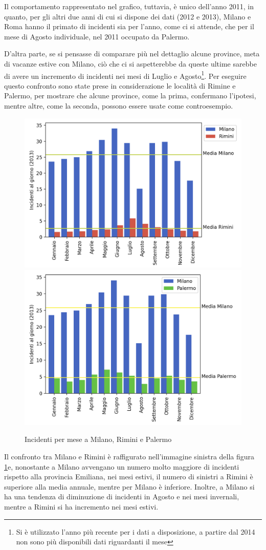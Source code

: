 \documentclass[a4paper,12pt]{report}
\begin{document}
Il comportamento rappresentato nel grafico, tuttavia, è unico dell'anno 2011, in quanto, 
per gli altri due anni di cui si dispone dei dati (2012 e 2013), 
Milano e Roma hanno il primato di incidenti sia per l'anno, come ci si attende, che per il 
mese di Agosto individuale, nel 2011 occupato da Palermo.

D'altra parte, se si pensasse di comparare più nel dettaglio alcune province, 
meta di vacanze estive con Milano, ciò che ci si aspetterebbe da queste ultime sarebbe 
di avere un incremento di incidenti nei mesi di Luglio e 
Agosto\footnote{Si è utilizzato l'anno più recente per i dati a disposizione, 
a partire dal 2014 non sono più disponibili dati riguardanti il mese}.
Per eseguire questo confronto sono state prese in considerazione le località di Rimine e Palermo, 
per mostrare che alcune province, come la prima, confermano l'ipotesi, mentre altre, 
come la seconda, possono essere usate come controesempio.

\begin{figure}
    \includegraphics[width=0.5\linewidth]{../src/incidenti/incidenti_senza_coords/mese_incidenti/milano_rimini.png}
    \includegraphics[width=0.5\linewidth]{../src/incidenti/incidenti_senza_coords/mese_incidenti/palermo_milano.png}
    \caption{Incidenti per mese a Milano, Rimini e Palermo}
    \label{fig:milano-rimini}
\end{figure}

Il confronto tra Milano e Rimini è raffigurato nell'immagine sinistra della 
figura \ref{fig:milano-rimini}e, nonostante a Milano avvengano un numero molto maggiore di 
incidenti rispetto alla provincia Emiliana, nei mesi estivi, 
il numero di sinistri a Rimini è superiore alla media annuale, 
mentre per Milano è inferiore. 
Inoltre, a Milano si ha una tendenza di diminuzione di incidenti in Agosto e nei 
mesi invernali, mentre a Rimini si ha incremento nei mesi estivi.
\end{document}
